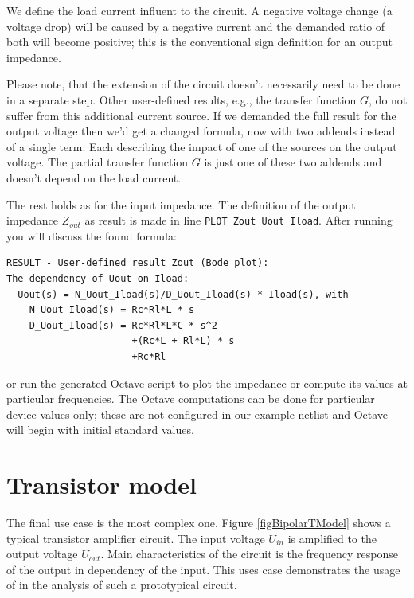 We define the load current influent to the circuit. A negative voltage
change (a voltage drop) will be caused by a negative current and the
demanded ratio of both will become positive; this is the conventional sign
definition for an output impedance.

Please note, that the extension of the circuit doesn't necessarily need to
be done in a separate step. Other user-defined  results, e.g.,
the transfer function $G$, do not suffer from this additional current
source. If we demanded the full result for the output voltage then we'd
get a changed formula, now with two addends instead of a single term: Each
describing the impact of one of the sources on the output voltage. The
partial transfer function $G$ is just one of these two addends and doesn't
depend on the load current.

The rest holds as for the input impedance. The definition of the output
impedance $Z_{out}$ as \linnet{} result is made in line
\verb+PLOT Zout Uout Iload+. After running \linnet{} you will discuss the found formula:
\begin{verbatim}
RESULT - User-defined result Zout (Bode plot):
The dependency of Uout on Iload:
  Uout(s) = N_Uout_Iload(s)/D_Uout_Iload(s) * Iload(s), with
    N_Uout_Iload(s) = Rc*Rl*L * s
    D_Uout_Iload(s) = Rc*Rl*L*C * s^2
                      +(Rc*L + Rl*L) * s
                      +Rc*Rl
\end{verbatim}
or run the generated Octave script  to plot the impedance or
compute its values at particular frequencies. The Octave computations can
be done for particular device values only; these are not configured in
our example netlist and Octave will begin with initial standard values.


\section{Transistor model}

The final use case is the most complex one. Figure \ref{figBipolarTModel}
shows a typical transistor amplifier circuit. The input voltage $U_{in}$
is amplified to the output voltage $U_{out}$. Main characteristics of the
circuit is the frequency response of the output in dependency of the
input. This uses case demonstrates the usage of \linnet{} in the analysis
of such a prototypical circuit.

